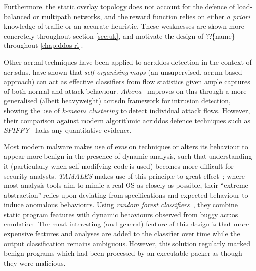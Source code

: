 Furthermore, the static overlay topology does not account for the defence of load-balanced or multipath networks, and the reward function relies on either \emph{a priori} knowledge of traffic or an accurate heuristic.
These weaknesses are shown more concretely throughout section \cref{sec:uk}, and motivate the design of ??\{name\} throughout \cref{chap:ddos-rl}.

Other \gls{acr:ml} techniques have been applied to \gls{acr:ddos} detection in the context of \glspl{acr:sdn}.
\textcite{DBLP:conf/lcn/BragaMP10} have shown that \emph{self-organising maps} (an unsupervised, \gls{acr:nn}-based approach) can act as effective classifiers from flow statistics given ample captures of both normal and attack behaviour.
\emph{Athena}~\parencite{DBLP:conf/dsn/LeeKSPY17} improves on this through a more generalised (albeit heavyweight) \gls{acr:sdn} framework for intrusion detection, showing the use of \emph{k-means clustering} to detect individual attack flows.
However, their comparison against modern algorithmic \gls{acr:ddos} defence techniques such as \emph{SPIFFY}~\parencite{DBLP:conf/ndss/KangGS16} lacks any quantitative evidence.

Most modern malware makes use of evasion techniques or alters its behaviour to appear more benign in the presence of dynamic analysis, such that understanding it (particularly when self-modifying code is used) becomes more difficult for security analysts.
\emph{TAMALES} makes use of this principle to great effect~\parencite{DBLP:conf/acsac/CoptyDEEMZ18}; where most analysis tools aim to mimic a real OS as closely as possible, their ``extreme abstraction'' relies upon deviating from specifications and expected behaviour to induce anomalous behaviours.
Using \emph{random forest classifiers}~\parencite{DBLP:journals/ml/Breiman01}, they combine static program features with dynamic behaviours observed from buggy \gls{acr:os} emulation.
The most interesting (and general) feature of this design is that more expensive features and analyses are added to the classifier over time while the output classification remains ambiguous.
However, this solution regularly marked benign programs which had been processed by an executable packer as though they were malicious.

